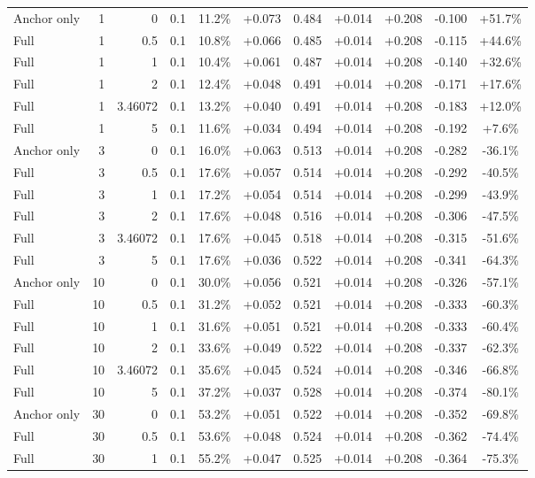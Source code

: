 \begin{table}[htbp]
\begin{tabular}{lrrrccccccc}
Anchor only & 1 & 0 & 0.1 & 11.2\% & +0.073 & 0.484 & +0.014 & +0.208 & -0.100 & +51.7\% \\
Full & 1 & 0.5 & 0.1 & 10.8\% & +0.066 & 0.485 & +0.014 & +0.208 & -0.115 & +44.6\% \\
Full & 1 & 1 & 0.1 & 10.4\% & +0.061 & 0.487 & +0.014 & +0.208 & -0.140 & +32.6\% \\
Full & 1 & 2 & 0.1 & 12.4\% & +0.048 & 0.491 & +0.014 & +0.208 & -0.171 & +17.6\% \\
Full & 1 & 3.46072 & 0.1 & 13.2\% & +0.040 & 0.491 & +0.014 & +0.208 & -0.183 & +12.0\% \\
Full & 1 & 5 & 0.1 & 11.6\% & +0.034 & 0.494 & +0.014 & +0.208 & -0.192 & +7.6\% \\
Anchor only & 3 & 0 & 0.1 & 16.0\% & +0.063 & 0.513 & +0.014 & +0.208 & -0.282 & -36.1\% \\
Full & 3 & 0.5 & 0.1 & 17.6\% & +0.057 & 0.514 & +0.014 & +0.208 & -0.292 & -40.5\% \\
Full & 3 & 1 & 0.1 & 17.2\% & +0.054 & 0.514 & +0.014 & +0.208 & -0.299 & -43.9\% \\
Full & 3 & 2 & 0.1 & 17.6\% & +0.048 & 0.516 & +0.014 & +0.208 & -0.306 & -47.5\% \\
Full & 3 & 3.46072 & 0.1 & 17.6\% & +0.045 & 0.518 & +0.014 & +0.208 & -0.315 & -51.6\% \\
Full & 3 & 5 & 0.1 & 17.6\% & +0.036 & 0.522 & +0.014 & +0.208 & -0.341 & -64.3\% \\
Anchor only & 10 & 0 & 0.1 & 30.0\% & +0.056 & 0.521 & +0.014 & +0.208 & -0.326 & -57.1\% \\
Full & 10 & 0.5 & 0.1 & 31.2\% & +0.052 & 0.521 & +0.014 & +0.208 & -0.333 & -60.3\% \\
Full & 10 & 1 & 0.1 & 31.6\% & +0.051 & 0.521 & +0.014 & +0.208 & -0.333 & -60.4\% \\
Full & 10 & 2 & 0.1 & 33.6\% & +0.049 & 0.522 & +0.014 & +0.208 & -0.337 & -62.3\% \\
Full & 10 & 3.46072 & 0.1 & 35.6\% & +0.045 & 0.524 & +0.014 & +0.208 & -0.346 & -66.8\% \\
Full & 10 & 5 & 0.1 & 37.2\% & +0.037 & 0.528 & +0.014 & +0.208 & -0.374 & -80.1\% \\
Anchor only & 30 & 0 & 0.1 & 53.2\% & +0.051 & 0.522 & +0.014 & +0.208 & -0.352 & -69.8\% \\
Full & 30 & 0.5 & 0.1 & 53.6\% & +0.048 & 0.524 & +0.014 & +0.208 & -0.362 & -74.4\% \\
Full & 30 & 1 & 0.1 & 55.2\% & +0.047 & 0.525 & +0.014 & +0.208 & -0.364 & -75.3\% \\

\end{tabular}
\end{table}
